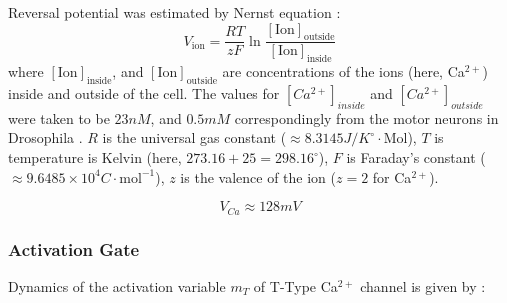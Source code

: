 \documentclass[../../workflow.tex]{subfiles}
\begin{document}
Reversal potential was estimated by Nernst equation \parencite{izhikevichDynamicalSystemsNeuroscience2006}:
\begin{equation*}
    V_{\text{ion}} = \frac{RT}{zF}\ln{\frac{[\text{Ion}]_{\text{outside}}}{[\text{Ion}]_{\text{inside}}}}
\end{equation*}
where $[\text{Ion}]_{\text{inside}}$, and $[\text{Ion}]_{\text{outside}}$ are concentrations of the ions
(here, Ca$^{2+}$) inside and outside of the cell. The values for $[Ca^{2+}]_{inside}$ and 
$[Ca^{2+}]_{outside}$ were taken to be $23 nM$, and $0.5 mM$ correspondingly
from the motor neurons in Drosophila \parencite{macleodFastCalciumSignals2002}.
$R$ is the universal gas constant
($\approx 8.3145 J/K^\circ \cdot \text{Mol}$), $T$ is temperature is Kelvin (here, $273.16+25=298.16^{\circ}$), $F$ is Faraday's constant
($\approx 9.6485 \times 10^{4} C\cdot \text{mol}^{-1}$), $z$ is the valence of the ion ($z=2$ for Ca$^{2+}$).

\begin{equation*}
    V_{Ca} \approx 128 mV
\end{equation*}


\subsubsection{Activation Gate}
Dynamics of the activation variable $m_T$ of T-Type Ca$^{2+}$ channel is given by \parencite{wangModelTtypeCalcium1991}:
\end{document}
